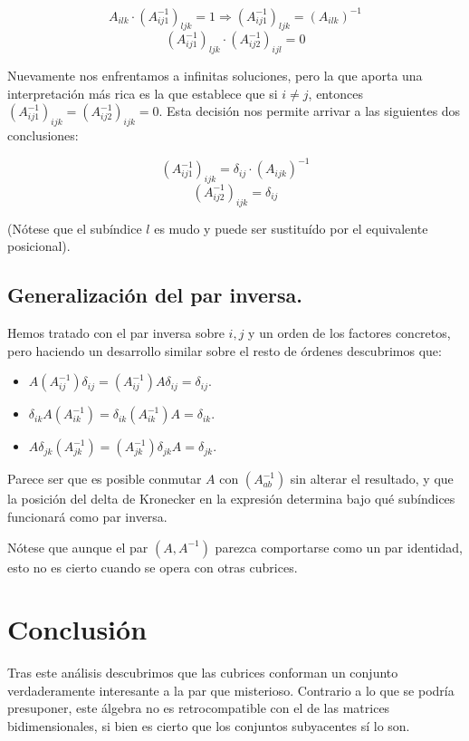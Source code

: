 \documentclass[a4paper, titlepage]{article}
\begin{document}
$$A_{ilk} \cdot (A_{ij1}^{-1})_{ljk} = 1 \Rightarrow (A_{ij1}^{-1})_{ljk} = (A_{ilk})^{-1}$$
$$(A_{ij1}^{-1})_{ljk} \cdot (A_{ij2}^{-1})_{ijl} = 0$$

Nuevamente nos enfrentamos a infinitas soluciones, pero la que aporta una interpretación más rica es la que establece que si ${i \neq j}$, entonces ${(A_{ij1}^{-1})_{ijk} = (A_{ij2}^{-1})_{ijk} = 0}$. Esta decisión nos permite arrivar a las siguientes dos conclusiones:

$$(A_{ij1}^{-1})_{ijk} = \delta_{ij} \cdot (A_{ijk})^{-1}$$
$$(A_{ij2}^{-1})_{ijk} = \delta_{ij}$$

(Nótese que el subíndice $l$ es mudo y puede ser sustituído por el equivalente posicional).

\subsection{Generalización del par inversa.}

Hemos tratado con el par inversa sobre $i, j$ y un orden de los factores concretos, pero haciendo un desarrollo similar sobre el resto de órdenes descubrimos que:

\begin{itemize}
	\item $A(A_{ij}^{-1})\delta_{ij} = (A_{ij}^{-1})A\delta_{ij} = \delta_{ij}$.
	\item $\delta_{ik}A(A_{ik}^{-1}) = \delta_{ik}(A_{ik}^{-1})A = \delta_{ik}$.
	\item $A\delta_{jk}(A_{jk}^{-1}) = (A_{jk}^{-1})\delta_{jk}A = \delta_{jk}$.
\end{itemize}

Parece ser que es posible conmutar $A$ con $(A_{ab}^{-1})$ sin alterar el resultado, y que la posición del delta de Kronecker en la expresión determina bajo qué subíndices funcionará como par inversa.

Nótese que aunque el par $(A, A^{-1})$ parezca comportarse como un par identidad, esto no es cierto cuando se opera con otras cubrices.

\fi

\section{Conclusión}

Tras este análisis descubrimos que las cubrices conforman un conjunto verdaderamente interesante a la par que misterioso. Contrario a lo que se podría presuponer, este álgebra no es retrocompatible con el de las matrices bidimensionales, si bien es cierto que los conjuntos subyacentes sí lo son.
\end{document}
